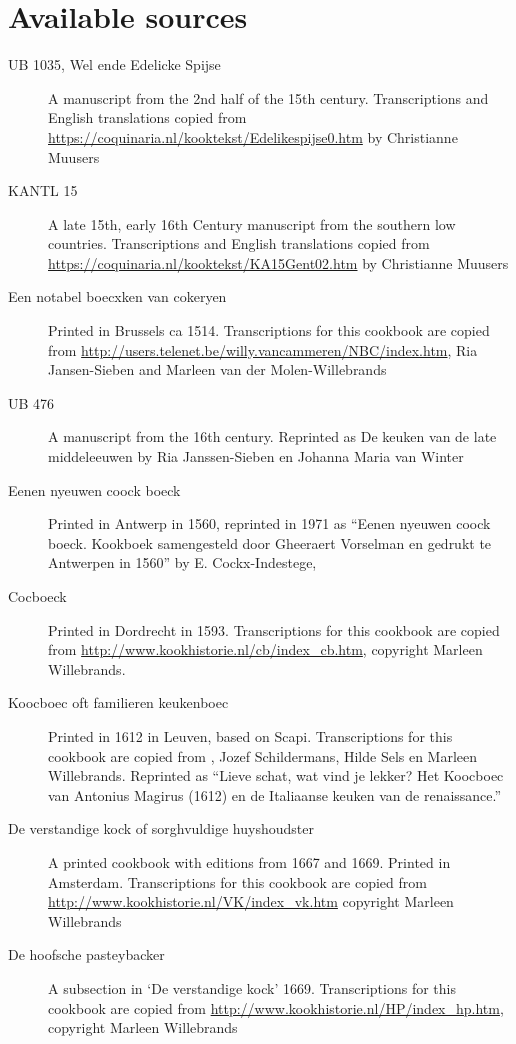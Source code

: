 \documentclass[a4paper]{article}
\begin{document}
\section{Available sources}
\label{sec:avSources}
\begin{description}

\item[UB 1035, Wel ende Edelicke Spijse] A manuscript from the 2nd half of the 15th century. Transcriptions and English translations copied from \url{https://coquinaria.nl/kooktekst/Edelikespijse0.htm} by Christianne Muusers

\item[KANTL 15] A late 15th, early 16th Century manuscript from the southern low countries.  Transcriptions and English translations copied from \url{https://coquinaria.nl/kooktekst/KA15Gent02.htm} by Christianne Muusers

\item[Een notabel boecxken van cokeryen] Printed in Brussels ca 1514. Transcriptions for this cookbook are copied from \url{http://users.telenet.be/willy.vancammeren/NBC/index.htm}, Ria Jansen-Sieben and Marleen van der Molen-Willebrands
\item[UB 476] A manuscript from the 16th century. Reprinted as De keuken van de late middeleeuwen by Ria Janssen-Sieben en Johanna Maria van Winter 
\item[Eenen nyeuwen coock boeck] Printed in Antwerp in 1560, reprinted in 1971 as “Eenen nyeuwen coock boeck. Kookboek samengesteld door Gheeraert Vorselman en gedrukt te Antwerpen in 1560” by E. Cockx-Indestege, 
\item[Cocboeck] Printed in Dordrecht in 1593. Transcriptions for this cookbook are copied from \url{http://www.kookhistorie.nl/cb/index_cb.htm}, copyright  Marleen Willebrands. 
\item[Koocboec oft familieren keukenboec] Printed in 1612 in Leuven, based on Scapi. Transcriptions for this cookbook are copied from , Jozef Schildermans, Hilde Sels en Marleen Willebrands. Reprinted as  “Lieve schat, wat vind je lekker? Het Koocboec van Antonius Magirus (1612) en de Italiaanse keuken van de renaissance.”
\item[De verstandige kock of sorghvuldige huyshoudster] A printed cookbook with editions from 1667 and 1669. Printed in Amsterdam. Transcriptions for this cookbook are copied from \url{http://www.kookhistorie.nl/VK/index_vk.htm} copyright Marleen Willebrands
\item[De hoofsche pasteybacker] A subsection in ‘De verstandige kock’ 1669. Transcriptions for this cookbook are copied from \url{http://www.kookhistorie.nl/HP/index_hp.htm}, copyright  Marleen Willebrands

\end{description}
\end{document}
